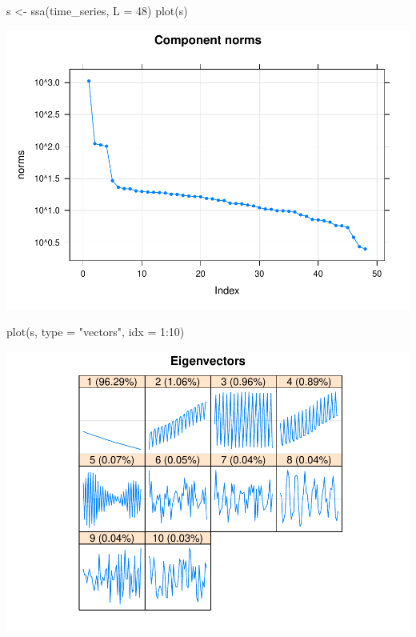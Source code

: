 \documentclass[specialist,
               substylefile = spbu_report.rtx,
               subf,href,colorlinks=true, 12pt]{disser}
\theoremstyle{definition}
\newenvironment{Shaded}{\begin{snugshade}}{\end{snugshade}}
\newcommand{\AttributeTok}[1]{\textcolor[rgb]{0.77,0.63,0.00}{#1}}
\newcommand{\DecValTok}[1]{\textcolor[rgb]{0.00,0.00,0.81}{#1}}
\newcommand{\FunctionTok}[1]{\textcolor[rgb]{0.00,0.00,0.00}{#1}}
\newcommand{\NormalTok}[1]{#1}
\newcommand{\OtherTok}[1]{\textcolor[rgb]{0.56,0.35,0.01}{#1}}
\newcommand{\SpecialCharTok}[1]{\textcolor[rgb]{0.00,0.00,0.00}{#1}}
\newcommand{\StringTok}[1]{\textcolor[rgb]{0.31,0.60,0.02}{#1}}
\begin{document}
\begin{Shaded}
\begin{Highlighting}[]
\NormalTok{  s }\OtherTok{\textless{}{-}} \FunctionTok{ssa}\NormalTok{(time\_series, }\AttributeTok{L =} \DecValTok{48}\NormalTok{)}
  \FunctionTok{plot}\NormalTok{(s)}
\end{Highlighting}
\end{Shaded}

\includegraphics{iossa_example2/eigen plot-1.pdf}

\begin{Shaded}
\begin{Highlighting}[]
  \FunctionTok{plot}\NormalTok{(s, }\AttributeTok{type =} \StringTok{"vectors"}\NormalTok{, }\AttributeTok{idx =} \DecValTok{1}\SpecialCharTok{:}\DecValTok{10}\NormalTok{)}
\end{Highlighting}
\end{Shaded}

\includegraphics{iossa_example2/vectors_plot-1.pdf}
\end{document}
